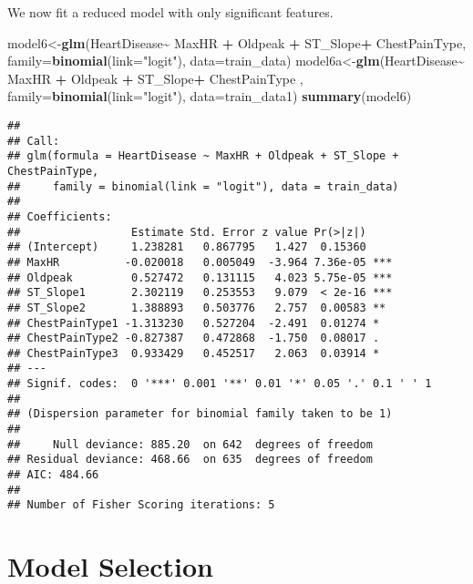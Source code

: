 \documentclass[
]{article}
\newenvironment{Shaded}{\begin{snugshade}}{\end{snugshade}}
\newcommand{\AttributeTok}[1]{\textcolor[rgb]{0.13,0.29,0.53}{#1}}
\newcommand{\FunctionTok}[1]{\textcolor[rgb]{0.13,0.29,0.53}{\textbf{#1}}}
\newcommand{\NormalTok}[1]{#1}
\newcommand{\OtherTok}[1]{\textcolor[rgb]{0.56,0.35,0.01}{#1}}
\newcommand{\SpecialCharTok}[1]{\textcolor[rgb]{0.81,0.36,0.00}{\textbf{#1}}}
\newcommand{\StringTok}[1]{\textcolor[rgb]{0.31,0.60,0.02}{#1}}
\begin{document}
We now fit a reduced model with only significant features.

\begin{Shaded}
\begin{Highlighting}[]
\NormalTok{model6}\OtherTok{\textless{}{-}}\FunctionTok{glm}\NormalTok{(HeartDisease}\SpecialCharTok{\textasciitilde{}}\NormalTok{  MaxHR }\SpecialCharTok{+}\NormalTok{  Oldpeak }\SpecialCharTok{+}\NormalTok{ ST\_Slope}\SpecialCharTok{+}
\NormalTok{              ChestPainType, }\AttributeTok{family=}\FunctionTok{binomial}\NormalTok{(}\AttributeTok{link=}\StringTok{"logit"}\NormalTok{), }\AttributeTok{data=}\NormalTok{train\_data)}
\NormalTok{model6a}\OtherTok{\textless{}{-}}\FunctionTok{glm}\NormalTok{(HeartDisease}\SpecialCharTok{\textasciitilde{}}\NormalTok{ MaxHR }\SpecialCharTok{+}\NormalTok{  Oldpeak }\SpecialCharTok{+}\NormalTok{ ST\_Slope}\SpecialCharTok{+}
\NormalTok{              ChestPainType , }\AttributeTok{family=}\FunctionTok{binomial}\NormalTok{(}\AttributeTok{link=}\StringTok{"logit"}\NormalTok{), }\AttributeTok{data=}\NormalTok{train\_data1)}
\FunctionTok{summary}\NormalTok{(model6)}
\end{Highlighting}
\end{Shaded}

\begin{verbatim}
## 
## Call:
## glm(formula = HeartDisease ~ MaxHR + Oldpeak + ST_Slope + ChestPainType, 
##     family = binomial(link = "logit"), data = train_data)
## 
## Coefficients:
##                 Estimate Std. Error z value Pr(>|z|)    
## (Intercept)     1.238281   0.867795   1.427  0.15360    
## MaxHR          -0.020018   0.005049  -3.964 7.36e-05 ***
## Oldpeak         0.527472   0.131115   4.023 5.75e-05 ***
## ST_Slope1       2.302119   0.253553   9.079  < 2e-16 ***
## ST_Slope2       1.388893   0.503776   2.757  0.00583 ** 
## ChestPainType1 -1.313230   0.527204  -2.491  0.01274 *  
## ChestPainType2 -0.827387   0.472868  -1.750  0.08017 .  
## ChestPainType3  0.933429   0.452517   2.063  0.03914 *  
## ---
## Signif. codes:  0 '***' 0.001 '**' 0.01 '*' 0.05 '.' 0.1 ' ' 1
## 
## (Dispersion parameter for binomial family taken to be 1)
## 
##     Null deviance: 885.20  on 642  degrees of freedom
## Residual deviance: 468.66  on 635  degrees of freedom
## AIC: 484.66
## 
## Number of Fisher Scoring iterations: 5
\end{verbatim}

\section{Model Selection}\label{model-selection}
\end{document}
